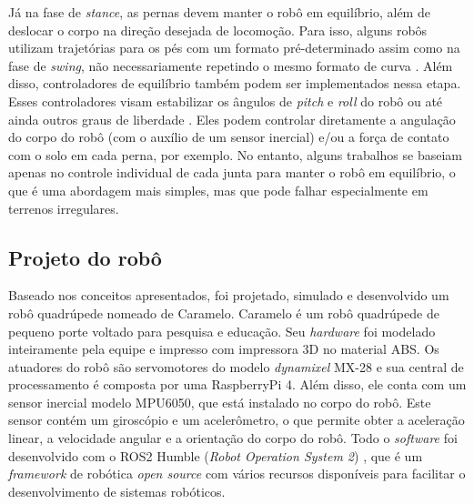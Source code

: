 \documentclass[../main.tex]{subfiles}
\begin{document}
Já na fase de \textit{stance}, as pernas devem manter o robô em equilíbrio, além de deslocar o corpo na direção desejada de locomoção. Para isso, alguns robôs utilizam trajetórias para os pés com um formato pré-determinado assim como na fase de \textit{swing}, não necessariamente repetindo o mesmo formato de curva \cite{X.118} \cite{X.58}. Além disso, controladores de equilíbrio também podem ser implementados nessa etapa. Esses controladores visam estabilizar os ângulos de \textit{pitch} e \textit{roll} do robô \cite{Shi2021} \cite{HackadayQuadruped} \cite{StanfordPupper} \cite{Notspot} ou até ainda outros graus de liberdade \cite{Chen2020140736} \cite{X.134} \cite{Zhang2016284}. Eles podem controlar diretamente a angulação do corpo do robô (com o auxílio de um sensor inercial) e/ou a força de contato com o solo em cada perna, por exemplo. No entanto, alguns trabalhos se baseiam apenas no controle individual de cada junta para manter o robô em equilíbrio, o que é uma abordagem mais simples, mas que pode falhar especialmente em terrenos irregulares.

\subsection{Projeto do robô}
Baseado nos conceitos apresentados, foi projetado, simulado e desenvolvido um robô quadrúpede nomeado de Caramelo. Caramelo é um robô quadrúpede de pequeno porte voltado para pesquisa e educação. Seu \textit{hardware} foi modelado inteiramente pela equipe e impresso com impressora 3D no material ABS. Os atuadores do robô são servomotores do modelo \textit{dynamixel} MX-28 e sua central de processamento é composta por uma RaspberryPi 4. Além disso, ele conta com um sensor inercial modelo MPU6050, que está instalado no corpo do robô. Este sensor contém um giroscópio e um acelerômetro, o que permite obter a aceleração linear, a velocidade angular e a orientação do corpo do robô. Todo o \textit{software} foi desenvolvido com o ROS2 Humble (\textit{Robot Operation System 2}) \cite{ROS2Humble}, que é um \textit{framework} de robótica \textit{open source} com vários recursos disponíveis para facilitar o desenvolvimento de sistemas robóticos.  
\end{document}
